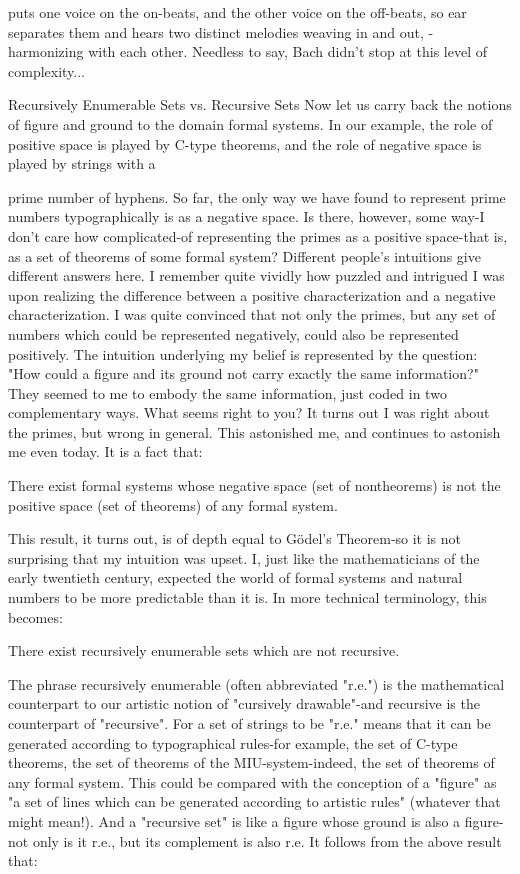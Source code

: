 puts one voice on the on-beats, and the other voice on the off-beats, so ear separates them and hears two distinct melodies weaving in and out, - harmonizing with each other. Needless to say, Bach didn't stop at this level of complexity... 

Recursively Enumerable Sets vs. Recursive Sets Now let us carry back the notions of figure and ground to the domain formal systems. In our example, the role of positive space is played by C-type theorems, and the role of negative space is played by strings with a 







prime number of hyphens. So far, the only way we have found to represent prime numbers typographically is as a negative space. Is there, however, some way-I don't care how complicated-of representing the primes as a positive space-that is, as a set of theorems of some formal system? Different people's intuitions give different answers here. I remember quite vividly how puzzled and intrigued I was upon realizing the difference between a positive characterization and a negative characterization. I was quite convinced that not only the primes, but any set of numbers which could be represented negatively, could also be represented positively. The intuition underlying my belief is represented by the question: "How could a figure and its ground not carry exactly the same information?" They seemed to me to embody the same information, just coded in two complementary ways. What seems right to you? It turns out I was right about the primes, but wrong in general. This astonished me, and continues to astonish me even today. It is a fact that: 

There exist formal systems whose negative space (set of nontheorems) is not the positive space (set of theorems) of any formal system. 

This result, it turns out, is of depth equal to Gödel’s Theorem-so it is not surprising that my intuition was upset. I, just like the mathematicians of the early twentieth century, expected the world of formal systems and natural numbers to be more predictable than it is. In more technical terminology, this becomes: 

There exist recursively enumerable sets which are not recursive. 

The phrase recursively enumerable (often abbreviated "r.e.") is the mathematical counterpart to our artistic notion of "cursively drawable"-and recursive is the counterpart of "recursive". For a set of strings to be "r.e." means that it can be generated according to typographical rules-for example, the set of C-type theorems, the set of theorems of the MIU-system-indeed, the set of theorems of any formal system. This could be compared with the conception of a "figure" as "a set of lines which can be generated according to artistic rules" (whatever that might mean!). And a "recursive set" is like a figure whose ground is also a figure-not only is it r.e., but its complement is also r.e. It follows from the above result that: 

